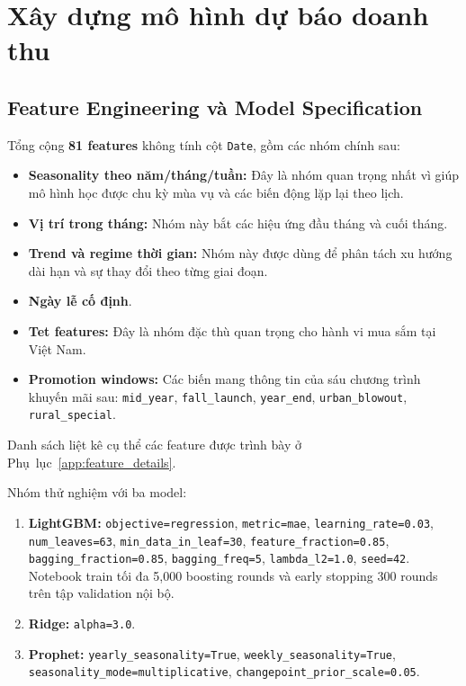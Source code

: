 \documentclass{article}
\begin{document}
\section{Xây dựng mô hình dự báo doanh thu}
\subsection{Feature Engineering và Model Specification}

Tổng cộng \textbf{81 features} không tính cột \texttt{Date}, gồm các nhóm chính sau:

\begin{itemize}
    \item\textbf{Seasonality theo năm/tháng/tuần:} Đây là nhóm quan trọng nhất
        vì giúp mô hình học được chu kỳ
        mùa vụ và các biến động lặp lại theo lịch.
    \item\textbf{Vị trí trong tháng:} Nhóm này bắt các hiệu ứng đầu tháng và
        cuối tháng.
    \item\textbf{Trend và regime thời gian:} Nhóm này được dùng để phân tách xu
        hướng dài hạn và sự thay đổi theo từng giai đoạn.
    \item\textbf{Ngày lễ cố định}.
    \item\textbf{Tet features:} Đây là nhóm đặc thù quan trọng cho hành vi mua
        sắm tại Việt Nam.
    \item\textbf{Promotion windows:} Các biến mang thông tin của sáu chương trình
        khuyến mãi sau: \texttt{mid\_year}, \texttt{fall\_launch},
        \texttt{year\_end}, \texttt{urban\_blowout}, \texttt{rural\_special}.
\end{itemize}

Danh sách liệt kê cụ thể các feature được trình bày ở Phụ~lục~\ref{app:feature_details}.

Nhóm thử nghiệm với ba model:
\begin{enumerate}
    \item\textbf{LightGBM:} \texttt{objective=regression}, \texttt{metric=mae}, \texttt{learning\_rate=0.03}, \texttt{num\_leaves=63}, \texttt{min\_data\_in\_leaf=30}, \texttt{feature\_fraction=0.85}, \texttt{bagging\_fraction=0.85}, \texttt{bagging\_freq=5}, \texttt{lambda\_l2=1.0}, \texttt{seed=42}. Notebook train tối đa 5,000 boosting rounds và early stopping 300 rounds trên tập validation nội bộ.\\
    \item\textbf{Ridge:} \texttt{alpha=3.0}. \hspace{8pt}
    \item\textbf{Prophet:} \texttt{yearly\_seasonality=True}, \texttt{weekly\_seasonality=True}, \texttt{seasonality\_mode=multiplicative}, \texttt{changepoint\_prior\_scale=0.05}.\\
\end{enumerate}
\end{document}
